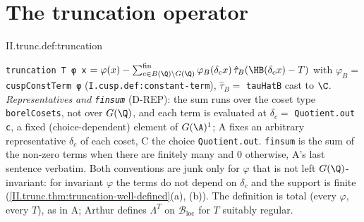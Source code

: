 \section{The truncation operator}\label{sec:trunc-operator}

\begin{definition}
\end{definition}
\begin{tfformal}{II.trunc.def:truncation}
\begin{tffidelity}
\texttt{truncation T φ x} $=\varphi(x)-\sum^{\mathrm{fin}}_{c\in B(\Q)\backslash G(\Q)}\varphi_B(\delta_cx)\,\hat\tau_B(\HB(\delta_cx)-T)$ with $\varphi_B=$ \texttt{cuspConstTerm φ} (\texttt{I.cusp.def:constant-term}), $\hat\tau_B=$ \texttt{tauHatB} cast to $\C$. \emph{Representatives and \texttt{finsum}} (D-REP): the sum runs over the coset type \texttt{borelCosets}, not over $G(\Q)$, and each term is evaluated at $\delta_c=$ \texttt{Quotient.out c}, a fixed (choice-dependent) element of $G(\A)^1$; A fixes an arbitrary representative $\delta_c$ of each coset, C the choice \texttt{Quotient.out}. \texttt{finsum} is the sum of the non-zero terms when there are finitely many and $0$ otherwise, A's last sentence verbatim. Both conventions are junk only for $\varphi$ that is not left $G(\Q)$-invariant: for invariant $\varphi$ the terms do not depend on $\delta_c$ and the support is finite (\cref{II.trunc.thm:truncation-well-defined}(a), (b)). The definition is total (every $\varphi$, every $T$), as in A; Arthur defines $\Lambda^T$ on $\mathcal B_{\mathrm{loc}}$ for $T$ suitably regular.
\end{tffidelity}
\end{tfformal}

